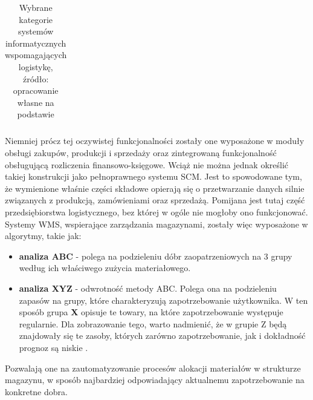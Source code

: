 \begin{center}
\begin{longtable}{| l | l | p{9.5cm} |}
				\caption[Wybrane kategorie systemów wspomagających logistykę]{
					Wybrane kategorie systemów informatycznych wspomagających logistykę,\\
					źródło: opracowanie własne na podstawie \cite{IDL}
				}
			\end{longtable}
		\end{center}
		Niemniej prócz tej oczywistej funkcjonalności zostały one wyposażone w moduły obsługi zakupów, produkcji i sprzedaży oraz zintegrowaną
		funkcjonalność obsługującą rozliczenia finansowo-księgowe. Wciąż nie można jednak określić takiej
		konstrukcji jako pełnoprawnego systemu SCM. Jest to spowodowane tym, że wymienione właśnie części składowe
		opierają się o przetwarzanie danych silnie związanych z produkcją, zamówieniami oraz sprzedażą. Pomijana 
		jest tutaj część przedsiębiorstwa logistycznego, bez której w ogóle nie mogłoby ono funkcjonować.
		Systemy WMS, wspierające zarządzania magazynami, zostały więc wyposażone w algorytmy, takie jak:
		\begin{itemize}
			\item \textbf{analiza ABC} - polega na podzieleniu dóbr zaopatrzeniowych na 3 grupy według ich właściwego zużycia materiałowego.
			\item \textbf{analiza XYZ} - odwrotność metody ABC. Polega ona na podzieleniu zapasów na grupy, które charakteryzują
			zapotrzebowanie użytkownika. W ten sposób grupa \textbf{X} opisuje te towary, na które zapotrzebowanie występuje regularnie.
			Dla zobrazowanie tego, warto nadmienić, że w grupie Z będą znajdowały się te zasoby, których zarówno zapotrzebowanie, 
			jak i dokładność prognoz są niskie .
		\end{itemize}
		Pozwalają one na zautomatyzowanie procesów alokacji materiałów w strukturze magazynu, w sposób najbardziej odpowiadający
		aktualnemu zapotrzebowanie na konkretne dobra.
		
